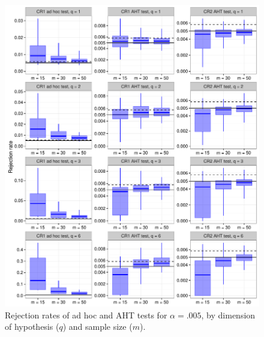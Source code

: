 \documentclass{article}\usepackage[]{graphicx}\usepackage[]{color}
\newenvironment{knitrout}{}{} %
\begin{document}
\begin{knitrout}
\color{fgcolor}\begin{figure}[H]

{\centering \includegraphics[width=\linewidth]{CR_fig/overview_005-1} 

}

\caption[Rejection rates of ad hoc and AHT tests for ]{Rejection rates of ad hoc and AHT tests for $\alpha = .005$, by dimension of hypothesis ($q$) and sample size ($m$).}\label{fig:overview_005}
\end{figure}


\end{knitrout}
\end{document}
